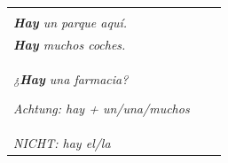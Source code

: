 \documentclass[11pt, a4paper, landscape]{article}
\begin{document}
\begin{center}
\begin{tabular}{@{}p{8.5cm}p{8.5cm}p{8.5cm}@{}}
\begin{tcolorbox}[
    colback=hay!10,
    colframe=hay,
    title={\color{white}\Large\bfseries HAY},
    fonttitle=\bfseries,
    width=8.3cm,
    height=11cm,
    valign=top
]
\vspace{0.8cm}

\textbf{Beispiele:}\\
\textit{\textbf{Hay} un parque aquí.}\\
\textit{\textbf{Hay} muchos coches.}\\
\textit{¿\textbf{Hay} una farmacia?}

\vspace{0.3cm}

\footnotesize\textit{Achtung: hay + un/una/muchos}\\
\footnotesize\textit{NICHT: hay el/la}
\end{tcolorbox}

\\
\end{tabular}
\end{center}

\vspace{0.5cm}


\begin{center}
\end{center}
\end{document}
